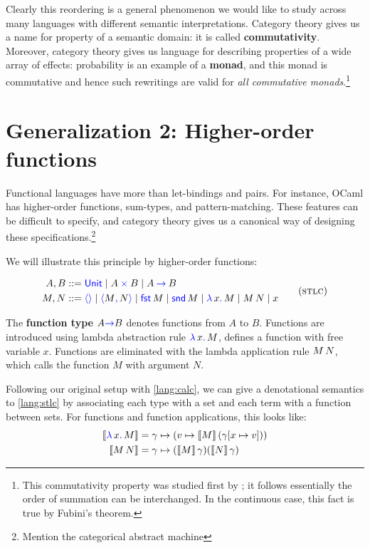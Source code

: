 Clearly this reordering is a general phenomenon we would like to study across 
many languages with different semantic interpretations.  Category theory gives
us a name for property of a semantic domain: it is called 
\textbf{commutativity}.  Moreover, category theory gives us language for
describing properties of a wide array of effects: probability is an example of a
\textbf{monad}, and this monad is commutative and hence such rewritings are
valid for \emph{all commutative monads}.\footnote{This commutativity property
was studied first by \citep{staton2017commutative}; it follows essentially the
order of summation can be interchanged. In the continuous case, this fact is
true by Fubini's theorem.}

\section{Generalization 2: Higher-order functions}
Functional languages have more than let-bindings and pairs. For instance, 
OCaml has higher-order functions, sum-types, and pattern-matching. These 
features can be difficult to specify, and category theory gives us a canonical 
way of designing these specifications.\footnote{Mention the categorical abstract machine}

We will illustrate this principle by higher-order functions:

\begin{gather}
  \begin{aligned}
   A,B &::= \plkw{Unit}
     \mid A \pltimes B
     \mid A \plto B
  \\
  M,N &::= \plunit{}
      \mid \plpair{M}{N}
      \mid \plfst{M}
      \mid \plsnd{M}
      \mid \pllam{x}{M}
      \mid \plapp{M}{N}
      \mid x
  \end{aligned}
  \label{lang:stlc}
  \tag{\textsc{stlc}}
\end{gather}

The \textbf{function type} $A \mathsf{{\color{blue}\to}} B$ denotes functions from $A$ 
to $B$. Functions are introduced using lambda abstraction rule ${\color{blue}\lambda}\,x{\color{blue}.}\,M$, defines a function 
with free variable $x$. Functions are eliminated with the lambda 
application rule $M\,N$, which calls the function $M$ with argument $N$.

Following our original setup with \ref{lang:calc}, we can give a denotational 
semantics to \ref{lang:stlc} by associating each type with a set and each 
term with a function between sets. For functions and function applications, this
looks like:
\begin{align*}
   \left\llbracket {\color{blue}\lambda}\,x{\color{blue}.}\,M\right\rrbracket &= \gamma \mapsto (v \mapsto \left\llbracket M\right\rrbracket(\gamma[x \mapsto v])) \\
  \left\llbracket M\,N\right\rrbracket &= \gamma \mapsto (\left\llbracket M\right\rrbracket\gamma)(\left\llbracket N\right\rrbracket\gamma) \\
\end{align*}


